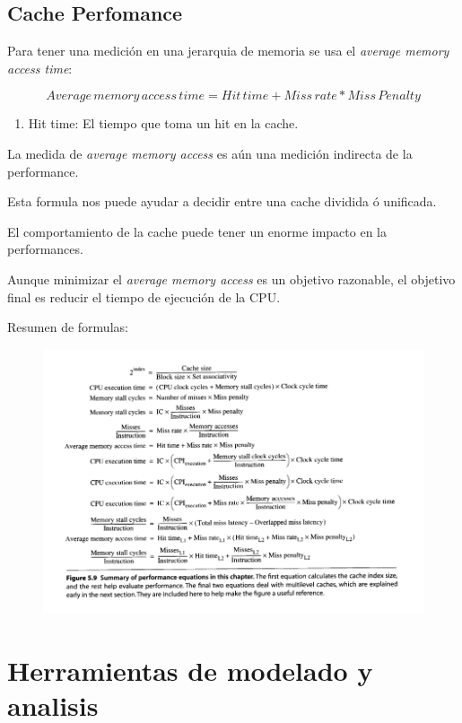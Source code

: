 \documentclass{article}
\begin{document}
\subsection{Cache Perfomance}

Para tener una medición en una jerarquia de memoria se usa el \textit{average memory access time}:

\begin{equation}
    Average\, memory\, access\, time = Hit\, time + Miss\, rate * Miss\, Penalty
\end{equation}

\begin{enumerate}
    \item Hit time: El tiempo que toma un hit en la cache.
\end{enumerate}


La medida de \textit{average memory access} es aún una medición indirecta de la performance.

Esta formula nos puede ayudar a decidir entre una cache dividida ó unificada.

El comportamiento de la cache puede tener un enorme impacto en la performances.

Aunque minimizar el \textit{average memory access} es un objetivo razonable, el objetivo final es reducir el tiempo de ejecución de la CPU.

Resumen de formulas:

\begin{figure}[h!]
    \includegraphics[width=\linewidth]{imagenes/ResumenPerformance.png}
\end{figure}

\newpage
\section{Herramientas de modelado y analisis}
\end{document}
